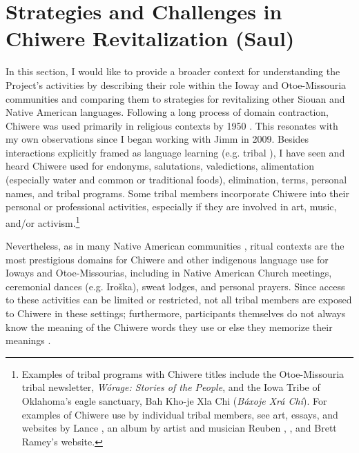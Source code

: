 \documentclass[output=paper]{LSP/langsci}
\begin{document}
\section{Strategies and Challenges in Chiwere Revitalization (Saul)}\label{saul}
In this section, I would like to provide a broader context for understanding the Project's activities by describing their role within the Ioway and Otoe-Missouria communities and comparing them to strategies for revitalizing other Siouan and Native American languages. Following a long process of domain contraction, Chiwere was used primarily in religious contexts by 1950 \citep{Davidson1997, FurbeeStanley1996, FurbeeStanley2002}. This resonates with my own observations since I began working with Jimm in 2009. Besides interactions explicitly framed as language learning (e.g. tribal ), I have seen and heard Chiwere used for endonyms, salutations, valedictions, alimentation (especially water and common or traditional foods), elimination,  terms, personal names, and tribal programs. Some tribal members incorporate Chiwere into their personal or professional activities, especially if they are involved in art, music, and/or activism.\footnote{Examples of tribal programs with Chiwere titles include the Otoe-Missouria tribal newsletter, \emph{Wórage: Stories of the People}, and the Iowa Tribe of Oklahoma's eagle sanctuary, Bah Kho-je Xla Chi (\emph{Báxoje Xrá Chí}). For examples of Chiwere use by individual tribal members, see art, essays, and websites by Lance \citet{Foster1989, Foster1996, Foster1999, Foster2009, FosterNDa, FosterNDb, FosterNDc}, an album by artist and musician Reuben \citet{Kent2004}, \citet{Jones2004}, and Brett Ramey's \citeyearpar{RameyND} website.} 

Nevertheless, as in many Native American communities \citep[see e.g.][]{Kroskrity1998}, ritual contexts are the most prestigious domains for Chiwere and other indigenous language use for Ioways and Otoe-Missourias, including in Native American Church meetings, ceremonial dances (e.g. Iroška), sweat lodges, and personal prayers. Since access to these activities can be limited or restricted, not all tribal members are exposed to Chiwere in these settings; furthermore, participants themselves do not always know the meaning of the Chiwere words they use or else they memorize their meanings \citep[see e.g.][520--521]{Davidson1997}.
\end{document}
